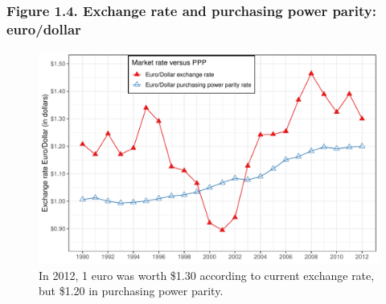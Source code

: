 \documentclass[t]{beamer}\usepackage[]{graphicx}\usepackage[]{color}
\newenvironment{knitrout}{}{} %
\begin{document}
\begin{frame}[label=Figure_1_4,fragile]
\frametitle{Figure 1.4. Exchange rate and purchasing power parity: euro/dollar}
\begin{figure}[t]
\begin{minipage}[b]{\textwidth}
\centering
\begin{knitrout}\footnotesize
{}\color{fgcolor}

{\centering \includegraphics[width=1\linewidth]{figures/color/Figure_1_4} 

}



\end{knitrout}
\caption{In 2012, 1 euro was worth \$1.30 according to current exchange rate, but \$1.20 in purchasing power parity.}
\end{minipage}
\end{figure}
\end{frame}
\end{document}
